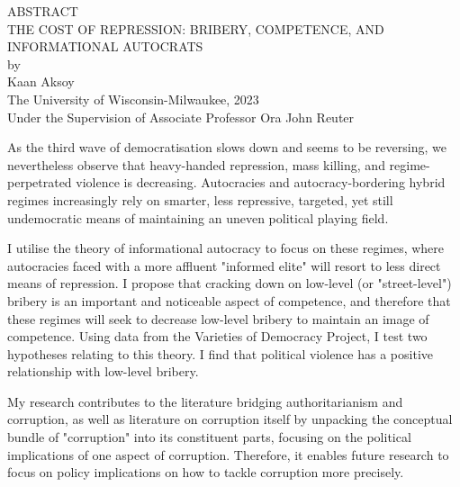 \begin{center}
	\begin{singlespace}
       ABSTRACT\\
       \vspace{0.5cm}
       THE COST OF REPRESSION: BRIBERY, COMPETENCE, AND INFORMATIONAL AUTOCRATS\\
       \vspace{0.5cm}
       by\\
       \vspace{0.5cm}
       Kaan Aksoy\\
       \vspace{0.5cm}
       The University of Wisconsin-Milwaukee, 2023\\
       Under the Supervision of Associate Professor Ora John Reuter\\
       \end{singlespace}    
       \vspace{2cm}	
       \justifying
As the third wave of democratisation slows down and seems to be reversing, we nevertheless observe that heavy-handed repression, mass killing, and regime-perpetrated violence is decreasing. Autocracies and autocracy-bordering hybrid regimes increasingly rely on smarter, less repressive, targeted, yet still undemocratic means of maintaining an uneven political playing field.

I utilise the theory of informational autocracy to focus on these regimes, where autocracies faced with a more affluent "informed elite" will resort to less direct means of repression. I propose that cracking down on low-level (or "street-level") bribery is an important and noticeable aspect of competence, and therefore that these regimes will seek to decrease low-level bribery to maintain an image of competence. Using data from the Varieties of Democracy Project, I test two hypotheses relating to this theory. I find that political violence has a positive relationship with low-level bribery.

My research contributes to the literature bridging authoritarianism and corruption, as well as literature on corruption itself by unpacking the conceptual bundle of "corruption" into its constituent parts, focusing on the political implications of one aspect of corruption. Therefore, it enables future research to focus on policy implications on how to tackle corruption more precisely.
\end{center}
